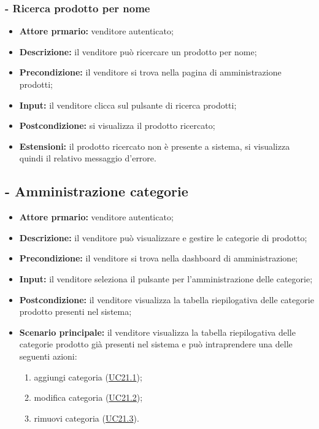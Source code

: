 \subsubsection{- Ricerca prodotto per nome}
\begin{itemize}
    \item \textbf{Attore prmario:} venditore autenticato;
    \item \textbf{Descrizione:} il venditore può ricercare un prodotto per nome;
    \item \textbf{Precondizione:} il venditore si trova nella pagina di amministrazione prodotti;
    \item \textbf{Input:} il venditore clicca sul pulsante di ricerca prodotti;
    \item \textbf{Postcondizione:} si visualizza il prodotto ricercato;
    \item \textbf{Estensioni:} il prodotto ricercato non è presente a sistema, si visualizza quindi il relativo messaggio d'errore.
\end{itemize}

\stepUserCase
\subsection{ - Amministrazione categorie}
\begin{itemize}
    \item \textbf{Attore prmario:} venditore autenticato;
    \item \textbf{Descrizione:}  il venditore può visualizzare e gestire le categorie di prodotto;
    \item \textbf{Precondizione:}  il venditore si trova nella dashboard di amministrazione;
    \item \textbf{Input:} il venditore seleziona il pulsante per l'amministrazione delle categorie;
    \item \textbf{Postcondizione:} il venditore visualizza la tabella riepilogativa delle categorie prodotto presenti nel sistema;
    \item \textbf{Scenario principale:} il venditore visualizza la tabella riepilogativa delle categorie prodotto già presenti nel sistema e può intraprendere una delle seguenti azioni:
          \begin{enumerate}
              \item aggiungi categoria (\hyperref[UC21.1]{UC21.1});
              \item modifica categoria (\hyperref[UC21.2]{UC21.2});
              \item rimuovi categoria (\hyperref[UC21.3]{UC21.3}).
          \end{enumerate}
\end{itemize}

